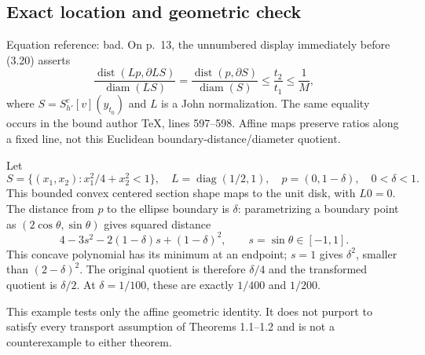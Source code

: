 \documentclass[10pt]{article}
\begin{document}
\subsection*{Exact location and geometric check}
Equation reference: bad. On p. 13, the unnumbered display immediately before (3.20) asserts \[
 \frac{\operatorname{dist}(Lp,\partial LS)}{\operatorname{diam}(LS)}
 =
 \frac{\operatorname{dist}(p,\partial S)}{\operatorname{diam}(S)}
 \leq\frac{t_2}{t_1}\leq\frac1M ,\] where \(S=S^c_{h'}[v](y_{t_0})\) and \(L\) is a John normalization. The same equality occurs in the bound author TeX, lines 597–598. Affine maps preserve ratios along a fixed line, not this Euclidean boundary-distance/diameter quotient.\par
Let \[S=\{(x_1,x_2):x_1^2/4+x_2^2<1\},\quad
 L=\operatorname{diag}(1/2,1),\quad p=(0,1-\delta),\quad 0<\delta<1.\] This bounded convex centered section shape maps to the unit disk, with \(L0=0\). The distance from \(p\) to the ellipse boundary is \(\delta\): parametrizing a boundary point as \((2\cos\theta,\sin\theta)\) gives squared distance \[4-3s^2-2(1-\delta)s+(1-\delta)^2,\qquad s=\sin\theta\in[-1,1].\] This concave polynomial has its minimum at an endpoint; \(s=1\) gives \(\delta^2\), smaller than \((2-\delta)^2\). The original quotient is therefore \(\delta/4\) and the transformed quotient is \(\delta/2\). At \(\delta=1/100\), these are exactly \(1/400\) and \(1/200\).\par
This example tests only the affine geometric identity. It does not purport to satisfy every transport assumption of Theorems 1.1–1.2 and is not a counterexample to either theorem.\par
\end{document}
